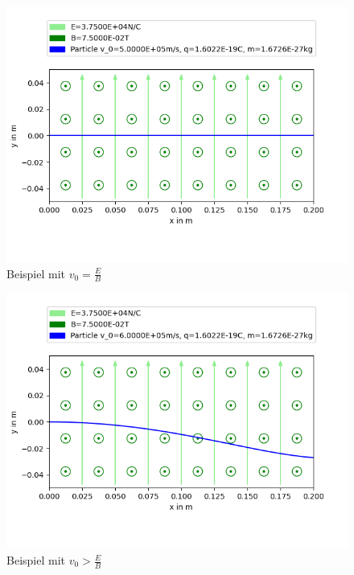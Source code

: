 \documentclass[german, a4paper, 10pt]{article}
\begin{document}
\begin{figure}[ht]
\caption{Beispiel mit $v_0=\frac{E}{B}$}
\centering
\includegraphics[width=\textwidth]{figure_3}
\end{figure}
\begin{figure}[ht]
\caption{Beispiel mit $v_0>\frac{E}{B}$}
\centering
\includegraphics[width=\textwidth]{figure_1}
\end{figure}
\end{document}
